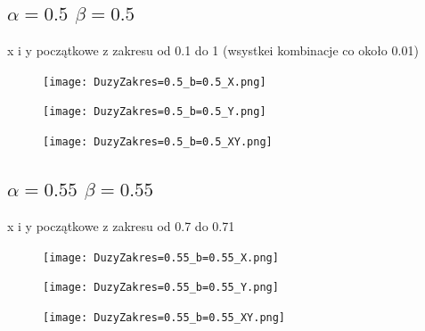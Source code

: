 \documentclass{article}
\begin{document}
    \subsection{$\alpha=0.5$ $\beta=0.5$}
    x i y początkowe z zakresu od 0.1 do 1 (wsystkei kombinacje co około 0.01)
            \begin{figure}[ht]
        \centering
        \begin{minipage}{.5\textwidth}
            \centering
            \texttt{[image: DuzyZakres=0.5\_b=0.5\_X.png]}
            \label{fig:test11}
        \end{minipage}%
        \begin{minipage}{.5\textwidth}
            \centering
            \texttt{[image: DuzyZakres=0.5\_b=0.5\_Y.png]}
            \label{fig:test12}
        \end{minipage}
        \centering
        \begin{minipage}{.5\textwidth}
            \centering
            \texttt{[image: DuzyZakres=0.5\_b=0.5\_XY.png]}
            \label{fig:test13}
        \end{minipage}%
    \end{figure}

    \newpage
    \subsection{$\alpha=0.55$ $\beta=0.55$}
    x i y początkowe z zakresu od 0.7 do 0.71
            \begin{figure}[ht]
        \centering
        \begin{minipage}{.5\textwidth}
            \centering
            \texttt{[image: DuzyZakres=0.55\_b=0.55\_X.png]}
            \label{fig:test11}
        \end{minipage}%
        \begin{minipage}{.5\textwidth}
            \centering
            \texttt{[image: DuzyZakres=0.55\_b=0.55\_Y.png]}
            \label{fig:test12}
        \end{minipage}
        \centering
        \begin{minipage}{.5\textwidth}
            \centering
            \texttt{[image: DuzyZakres=0.55\_b=0.55\_XY.png]}
            \label{fig:test13}
        \end{minipage}%
    \end{figure}
\end{document}
